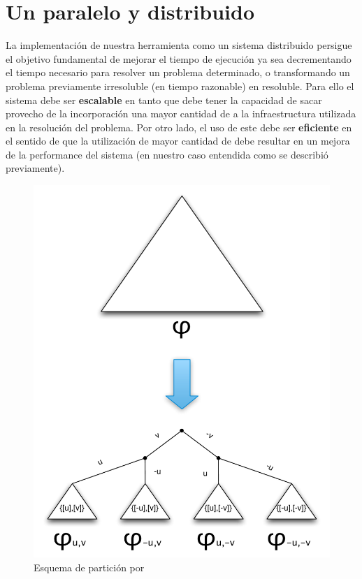 

\chapter{Un \ssolver paralelo y distribuido }
\label{ssolver-pardist}

La implementación de nuestra herramienta como un sistema distribuido persigue
el objetivo fundamental de mejorar el tiempo de ejecución ya sea decrementando
el tiempo necesario para resolver un problema determinado, o transformando un
problema previamente irresoluble (en tiempo razonable) en resoluble. Para ello
el sistema debe ser \textbf{escalable} en tanto que debe tener la capacidad de
sacar provecho de la incorporación una mayor cantidad de \hard a la infraestructura
utilizada en la resolución del problema. Por otro
lado, el uso de este \hard debe ser \textbf{eficiente} en el sentido de que la
utilización de mayor cantidad de \hard debe resultar en un mejora de la
performance del sistema (en nuestro caso entendida como se describió
previamente).

\begin{figure}
\includegraphics[scale=0.4]{graphs/split por guiding path}
\caption{Esquema de partición por \gp}
\label{fig:guidingpaths}
\end{figure}

